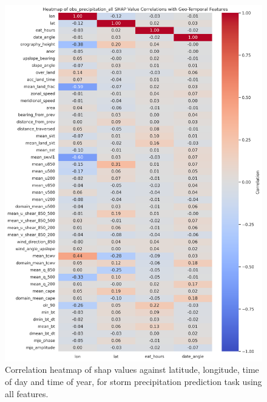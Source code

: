 \begin{figure}[ht]
    \centering
    \includegraphics[width=\textwidth]{../figures/generated/experiments/obs_precipitation/obs_precipitation_all_shap_correlation_heatmap.png}
    \caption{Correlation heatmap of \acrshort{shap} values against latitude, longitude, time of day and time of year, for storm precipitation prediction task using all features.}
    \label{fig:obs_precipitation_all_shap_heatmap}
\end{figure}
